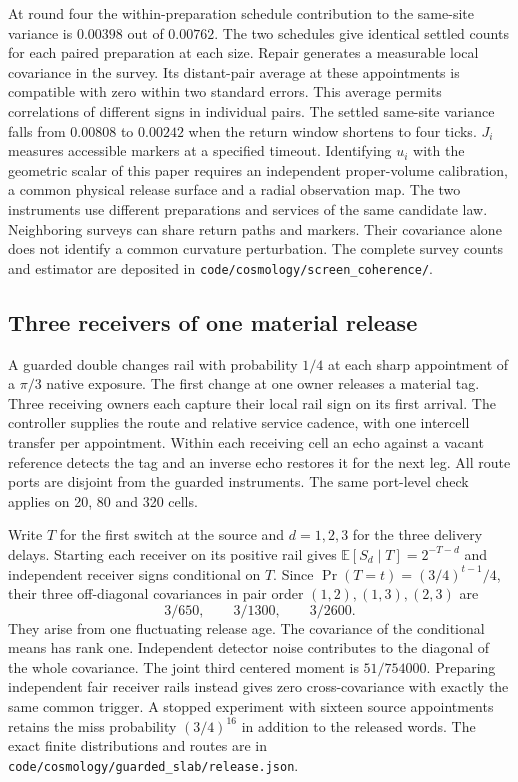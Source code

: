 \documentclass[11pt]{article}
\newcommand{\pathref}[1]{\nolinkurl{#1}}
\theoremstyle{remark}
\begin{document}
At round four the within-preparation schedule contribution to the
same-site variance is $0.00398$ out of $0.00762$. The two schedules
give identical settled counts for each paired preparation at each size.
Repair generates a measurable local covariance in the survey. Its
distant-pair average at these appointments is compatible with zero
within two standard errors. This average permits correlations of
different signs in individual pairs. The settled same-site variance
falls from $0.00808$ to $0.00242$ when the return window shortens to
four ticks. $J_i$ measures accessible markers at a specified timeout.
Identifying $u_i$ with the geometric scalar of this paper requires an
independent proper-volume calibration, a common physical release surface
and a radial observation map. The two instruments use different
preparations and services of the same candidate law. Neighboring surveys
can share return paths and markers. Their covariance alone does not identify
a common curvature perturbation. The complete survey counts and estimator
are deposited in \pathref{code/cosmology/screen_coherence/}.

\subsection{Three receivers of one material release}

A guarded double changes rail with probability \(1/4\) at each sharp
appointment of a \(\pi/3\) native exposure. The first change at one owner
releases a material tag. Three receiving owners each capture their local
rail sign on its first arrival. The controller supplies the route and
relative service cadence, with one intercell transfer per appointment.
Within each receiving cell an echo against a vacant reference detects the
tag and an inverse echo restores it for the next leg. All route ports are
disjoint from the guarded instruments. The same port-level check applies on
20, 80 and 320 cells.

Write \(T\) for the first switch at the source and \(d=1,2,3\) for the
three delivery delays. Starting each receiver on its positive rail gives
\(\mathbb E[S_d\mid T]=2^{-T-d}\) and independent receiver signs conditional
on \(T\). Since \(\Pr(T=t)=(3/4)^{t-1}/4\), their three off-diagonal
covariances in pair order \((1,2),(1,3),(2,3)\) are
\[
 3/650,\qquad 3/1300,\qquad 3/2600 .
\]
They arise from one fluctuating release age. The covariance of the conditional
means has rank one. Independent detector noise contributes to the diagonal
of the whole covariance. The joint third centered moment is
\(51/754000\). Preparing independent fair receiver rails instead gives zero
cross-covariance with exactly the same common trigger. A stopped experiment
with sixteen source appointments retains the miss probability \((3/4)^{16}\)
in addition to the released words. The exact finite distributions and routes
are in \nolinkurl{code/cosmology/guarded_slab/release.json}.
\end{document}
